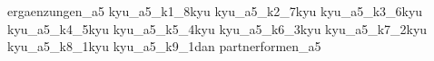 
\usepackage{import}
\usepackage[backend=biber,style=numeric]{biblatex}

\AtBeginBibliography{\scriptsize}

	\nocite{*}
	{ergaenzungen_a5}\clearpage\pagebreak
	{kyu_a5_k1_8kyu}\clearpage\pagebreak
	{kyu_a5_k2_7kyu}\clearpage\pagebreak
	{kyu_a5_k3_6kyu}\clearpage\pagebreak
	{kyu_a5_k4_5kyu}\clearpage\pagebreak
	{kyu_a5_k5_4kyu}\clearpage\pagebreak
	{kyu_a5_k6_3kyu}\clearpage\pagebreak
	{kyu_a5_k7_2kyu}\clearpage\pagebreak
	{kyu_a5_k8_1kyu}\clearpage\pagebreak
	{kyu_a5_k9_1dan}\clearpage\pagebreak
	\AddToShipoutPictureFG{\ShowDraft}
	{partnerformen_a5}\clearpage\pagebreak
	\ClearShipoutPictureFG
	\twocolumn
	\printbibliography[title={\small Verwendete Literatur und Internetquellen}]

